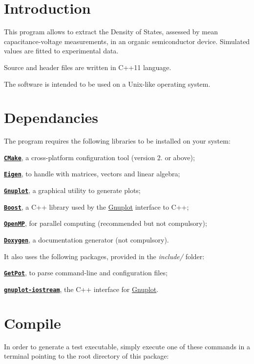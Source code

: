 \hypertarget{index_intro}{}\section{Introduction}\label{index_intro}
This program allows to extract the Density of States, assessed by mean capacitance-\/voltage measurements, in an organic semiconductor device. Simulated values are fitted to experimental data. \par
Source and header files are written in C++11 language. \par
The software is intended to be used on a Unix-\/like operating system.\hypertarget{index_dependancies}{}\section{Dependancies}\label{index_dependancies}
The program requires the following libraries to be installed on your system\-:

\begin{DoxyItemize}
\item \href{http://www.cmake.org}{\tt {\bfseries C\-Make}}, a cross-\/platform configuration tool (version 2. or above); \item \label{index_Eigen}%
\hypertarget{index_Eigen}{}%
\href{http://eigen.tuxfamily.org}{\tt {\bfseries Eigen}}, to handle with matrices, vectors and linear algebra; \item \label{index_Gnuplot}%
\hypertarget{index_Gnuplot}{}%
\href{http://www.gnuplot.info}{\tt {\bfseries Gnuplot}}, a graphical utility to generate plots; \item \href{http://www.boost.org}{\tt {\bfseries Boost}}, a C++ library used by the \hyperlink{index_Gnuplot}{Gnuplot} interface to C++; \item \href{http://openmp.org}{\tt {\bfseries Open\-M\-P}}, for parallel computing (recommended but not compulsory); \item \href{http://www.doxygen.org}{\tt {\bfseries Doxygen}}, a documentation generator (not compulsory).\end{DoxyItemize}
It also uses the following packages, provided in the {\itshape include/} folder\-: \begin{DoxyItemize}
\item \href{http://getpot.sourceforge.net}{\tt {\bfseries Get\-Pot}}, to parse command-\/line and configuration files; \item \href{http://www.stahlke.org/dan/gnuplot-iostream}{\tt {\bfseries gnuplot-\/iostream}}, the C++ interface for \hyperlink{index_Gnuplot}{Gnuplot}.\end{DoxyItemize}
\hypertarget{index_install_sec}{}\section{Compile}\label{index_install_sec}
In order to generate a test executable, simply execute one of these commands in a terminal pointing to the root directory of this package\-:


